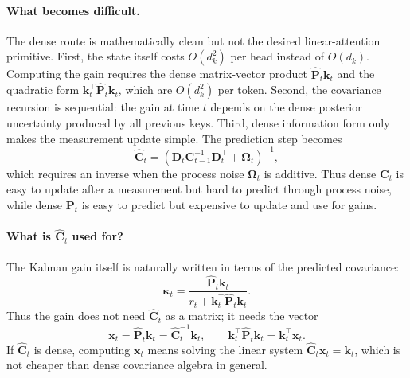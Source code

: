 \documentclass[11pt]{article}
\newcommand{\ve}[1]{\boldsymbol{#1}}
\newcommand{\tr}{\intercal}
\begin{document}
\paragraph{What becomes difficult.}
The dense route is mathematically clean but not the desired linear-attention primitive.
First, the state itself costs $O(d_k^2)$ per head instead of $O(d_k)$. Computing the gain
requires the dense matrix-vector product $\widehat{\ve{P}}_t\ve{k}_t$ and the quadratic form
$\ve{k}_t^{\tr}\widehat{\ve{P}}_t\ve{k}_t$, which are $O(d_k^2)$ per token. Second, the
covariance recursion is sequential: the gain at time $t$ depends on the dense posterior
uncertainty produced by all previous keys. Third, dense information form only makes the
measurement update simple. The prediction step becomes
\begin{equation}
  \widehat{\ve{C}}_t
  =
  \left(\ve{D}_t\ve{C}_{t-1}^{-1}\ve{D}_t^{\tr}+\ve{\Omega}_t\right)^{-1},
  \label{eq:dense-info-predict-hard}
\end{equation}
which requires an inverse when the process noise $\ve{\Omega}_t$ is additive. Thus dense
$\ve{C}_t$ is easy to update after a measurement but hard to predict through process noise,
while dense $\ve{P}_t$ is easy to predict but expensive to update and use for gains.

\paragraph{What is $\widehat{\ve{C}}_t$ used for?}
The Kalman gain itself is naturally written in terms of the predicted covariance:
\begin{equation}
  \ve{\kappa}_t
  =
  \frac{\widehat{\ve{P}}_t\ve{k}_t}
  {r_t+\ve{k}_t^{\tr}\widehat{\ve{P}}_t\ve{k}_t}.
  \label{eq:gain-needs-phat}
\end{equation}
Thus the gain does not need $\widehat{\ve{C}}_t$ as a matrix; it needs the vector
\begin{equation}
  \ve{x}_t=\widehat{\ve{P}}_t\ve{k}_t
  =
  \widehat{\ve{C}}_t^{-1}\ve{k}_t,
  \qquad
  \ve{k}_t^{\tr}\widehat{\ve{P}}_t\ve{k}_t=\ve{k}_t^{\tr}\ve{x}_t.
  \label{eq:gain-from-chat-solve}
\end{equation}
If $\widehat{\ve{C}}_t$ is dense, computing $\ve{x}_t$ means solving the linear system
$\widehat{\ve{C}}_t\ve{x}_t=\ve{k}_t$, which is not cheaper than dense covariance algebra in
general.
\end{document}
